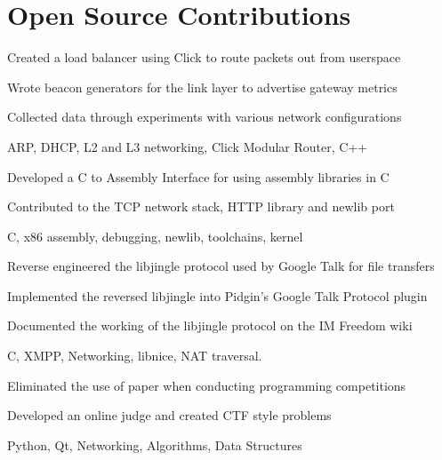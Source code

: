 \documentclass[letterpaper]{deedy-resume-openfont} %
\begin{document}
\begin{minipage}[t]{0.66\textwidth}
\section{Open Source Contributions}
\begin{tightemize}
\item Created a load balancer using Click to route packets out from userspace
\item Wrote beacon generators for the link layer to advertise gateway metrics 
\item Collected data through experiments with various network configurations
\item ARP, DHCP, L2 and L3 networking, Click Modular Router, C++
\end{tightemize}
\sectionsep %
\begin{tightemize}
\item Developed a C to Assembly Interface for using assembly libraries in C
\item Contributed to the TCP network stack, HTTP library and newlib port
\item C, x86 assembly, debugging, newlib, toolchains, kernel
\end{tightemize}
\sectionsep %
\begin{tightemize}
\item Reverse engineered the libjingle protocol used by Google Talk for file transfers
\item Implemented the reversed libjingle into Pidgin's Google Talk Protocol plugin
\item Documented the working of the libjingle protocol on the IM Freedom wiki
\item C, XMPP, Networking, libnice, NAT traversal.
\end{tightemize}
\sectionsep %
\begin{tightemize}
\item Eliminated the use of paper when conducting programming competitions
\item Developed an online judge and created CTF style problems
\item Python, Qt, Networking, Algorithms, Data Structures
\end{tightemize}
\sectionsep %

\end{minipage}
\end{document}
